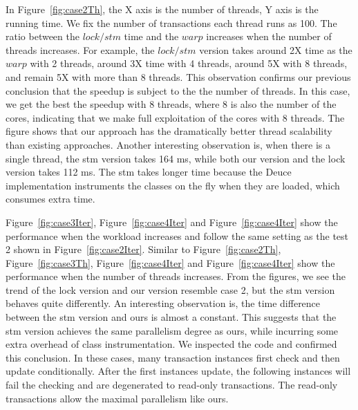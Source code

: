In Figure~\ref{fig:case2Th}, the X axis is the number of threads, Y axis is the running time. We fix the number of transactions each thread runs as 100. The ratio between the $lock/stm$ time and the $warp$ increases when the number of threads increases. For example, the $lock/stm$ version takes around 2X time as the $warp$ with 2 threads, around 3X time with 4 threads, around 5X with 8 threads, and remain 5X with more than 8 threads. This observation confirms our previous conclusion that the speedup is subject to the the number of threads. In this case, we get the best the speedup with 8 threads, where 8 is also the number of the cores, indicating that we make full exploitation of the cores with 8 threads. The figure shows that our approach has the dramatically better thread scalability than existing approaches. Another interesting observation is, when there is a single thread, the stm version takes 164 ms, while both our version and the lock version takes 112 ms. The stm takes longer time because the Deuce implementation instruments the classes on  the fly when they are loaded, which consumes extra time. 


Figure~\ref{fig:case3Iter}, Figure~\ref{fig:case4Iter} and Figure~\ref{fig:case4Iter} show the performance when the workload increases and follow the same setting as the test 2 shown in Figure~\ref{fig:case2Iter}. Similar to Figure~\ref{fig:case2Th}, Figure~\ref{fig:case3Th}, Figure~\ref{fig:case4Iter} and Figure~\ref{fig:case4Iter} show the performance when the number of threads increases. From the figures, we see the trend of the lock version and our version resemble case 2, but the stm version behaves quite differently. An interesting observation is, the time difference between the stm version and ours is almost a constant. This suggests that the stm version achieves the same parallelism degree as ours, while incurring some extra  overhead of class instrumentation. We inspected the code and confirmed this conclusion. In these cases, many transaction instances first check and then update conditionally. After the first instances update, the following instances will fail the checking and are degenerated to read-only transactions. The read-only transactions allow the maximal parallelism like ours. 






